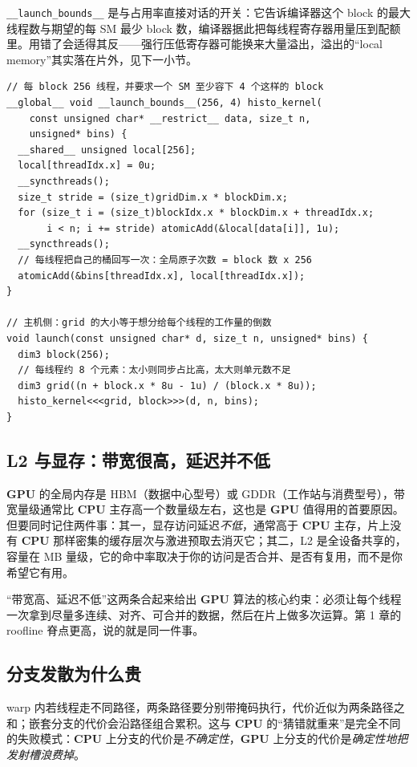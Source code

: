 \documentclass[12pt,a4paper,fontset=fandol]{ctexbook}
\newcommand{\Tp}[1]{\texttt{#1}}
\newcommand{\Bk}{\allowbreak}
\newcommand{\Dom}[1]{\textsf{\bfseries #1}}
\newcommand{\CPU}{\Dom{CPU}}
\newcommand{\GPU}{\Dom{GPU}}
\begin{document}
\Tp{\_\_launch\Bk\_bounds\_\_} 是与占用率直接对话的开关：它告诉编译器这个 block 的最大线程数与期望的每 SM 最少 block 数，编译器据此把每线程寄存器用量压到配额里。用错了会适得其反——强行压低寄存器可能换来大量溢出，溢出的``local memory''其实落在片外，见下一小节。

\begin{lstlisting}[style=cudastyle,caption={启动配置：block 形状、grid 推导与 launch bounds}]
// 每 block 256 线程，并要求一个 SM 至少容下 4 个这样的 block
__global__ void __launch_bounds__(256, 4) histo_kernel(
    const unsigned char* __restrict__ data, size_t n,
    unsigned* bins) {
  __shared__ unsigned local[256];
  local[threadIdx.x] = 0u;
  __syncthreads();
  size_t stride = (size_t)gridDim.x * blockDim.x;
  for (size_t i = (size_t)blockIdx.x * blockDim.x + threadIdx.x;
       i < n; i += stride) atomicAdd(&local[data[i]], 1u);
  __syncthreads();
  // 每线程把自己的桶回写一次：全局原子次数 = block 数 x 256
  atomicAdd(&bins[threadIdx.x], local[threadIdx.x]);
}

// 主机侧：grid 的大小等于想分给每个线程的工作量的倒数
void launch(const unsigned char* d, size_t n, unsigned* bins) {
  dim3 block(256);
  // 每线程约 8 个元素：太小则同步占比高，太大则单元数不足
  dim3 grid((n + block.x * 8u - 1u) / (block.x * 8u));
  histo_kernel<<<grid, block>>>(d, n, bins);
}
\end{lstlisting}

\subsection{L2 与显存：带宽很高，延迟并不低}

\GPU{} 的全局内存是 HBM（数据中心型号）或 GDDR（工作站与消费型号），带宽量级通常比 \CPU{} 主存高一个数量级左右，这也是 \GPU{} 值得用的首要原因。但要同时记住两件事：其一，显存访问延迟\emph{不低}，通常高于 \CPU{} 主存，片上没有 \CPU{} 那样密集的缓存层次与激进预取去消灭它；其二，L2 是全设备共享的，容量在 MB 量级，它的命中率取决于你的访问是否合并、是否有复用，而不是你希望它有用。

``带宽高、延迟不低''这两条合起来给出 \GPU{} 算法的核心约束：必须让每个线程一次拿到尽量多连续、对齐、可合并的数据，然后在片上做多次运算。第 1 章的 roofline 脊点更高，说的就是同一件事。

\subsection{分支发散为什么贵}

warp 内若线程走不同路径，两条路径要分别带掩码执行，代价近似为两条路径之和；嵌套分支的代价会沿路径组合累积。这与 \CPU{} 的``猜错就重来''是完全不同的失败模式：\CPU{} 上分支的代价是\emph{不确定性}，\GPU{} 上分支的代价是\emph{确定性地把发射槽浪费掉}。
\end{document}
